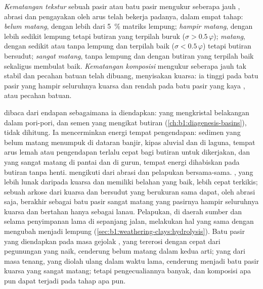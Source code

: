 \begin{definition}\label{def:b1:clastic-sediments:maturity}
\emph{Kematangan tekstur} sebuah pasir atau batu pasir mengukur seberapa jauh , abrasi dan pengayakan oleh arus telah bekerja padanya, dalam empat tahap: \emph{belum matang}, dengan lebih dari \qty{5}{\percent} matriks lempung; \emph{hampir matang}, dengan lebih sedikit lempung tetapi butiran yang terpilah buruk ($\sigma > 0.5\,\varphi$); \emph{matang}, dengan sedikit atau tanpa lempung dan terpilah baik ($\sigma < 0.5\,\varphi$) tetapi butiran bersudut; \emph{sangat matang}, tanpa lempung dan dengan butiran yang terpilah baik sekaligus membulat baik. \emph{Kematangan komposisi} mengukur seberapa jauh  tak stabil dan pecahan batuan telah dibuang, menyisakan kuarsa: ia tinggi pada batu pasir yang hampir seluruhnya kuarsa dan rendah pada batu pasir yang kaya ,  atau pecahan batuan.
\end{definition}

 dibaca dari endapan sebagaimana ia diendapkan:  yang mengkristal belakangan dalam pori-pori, dan semen yang mengikat butiran (\cref{ch:b1:diagenesis-basins}), tidak dihitung. Ia mencerminkan energi tempat pengendapan: sedimen yang belum matang menumpuk di dataran banjir, kipas aluvial dan di laguna, tempat arus lemah atau pengendapan terlalu cepat bagi butiran untuk dikerjakan, dan yang sangat matang di pantai dan di  gurun, tempat energi dihabiskan pada butiran tanpa henti.  mengikuti dari abrasi dan pelapukan bersama-sama. , yang lebih lunak daripada kuarsa dan memiliki belahan yang baik, lebih cepat terkikis; sebuah arkose dari kuarsa dan  bersudut yang berukuran sama dapat, oleh abrasi saja, berakhir sebagai batu pasir sangat matang yang pasirnya hampir seluruhnya kuarsa dan  bertahan hanya sebagai lanau. Pelapukan, di daerah sumber dan selama penyimpanan lama di sepanjang jalan, melakukan hal yang sama dengan mengubah  menjadi lempung (\cref{sec:b1:weathering-clays:hydrolysis}). Batu pasir yang diendapkan pada masa gejolak , yang tererosi dengan cepat dari pegunungan yang naik, cenderung belum matang dalam kedua arti; yang dari masa tenang, yang diolah ulang dalam waktu lama, cenderung menjadi batu pasir kuarsa yang sangat matang; tetapi pengecualiannya banyak, dan komposisi apa pun dapat terjadi pada tahap  apa pun.

